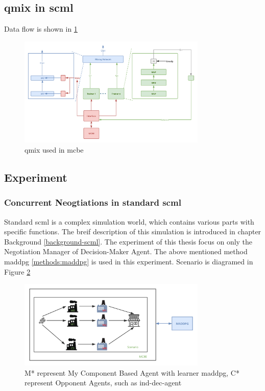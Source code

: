 \subsection{\gls{qmix} in \gls{scml}}
Data flow is shown in \ref{fig:method-qmix-scml}

\begin{figure}[htbp]
\centering
\includegraphics[width=0.80\textwidth]{./images/scml-qmix.png}
\caption{\gls{qmix} used in \gls{mcbe}}
\label{fig:method-qmix-scml}
\end{figure}

\subsection{Experiment}
\subsubsection{Concurrent Neogtiations in standard \gls{scml}}
Standard \gls{scml} is a complex simulation world, which contains various parts with specific functions. The breif description of this simulation is introduced in chapter Background \ref{background-scml}. The experiment of this thesis focus on only the Negotiation Manager of Decision-Maker Agent. The above mentioned method maddpg \ref{methods:maddpg} is used in this experiment. 
Scenario is diagramed in Figure \ref{fig:scenario-standar-scml}

\begin{figure}[htbp]
\centering
\includegraphics[width=0.80\textwidth]{./images/scenario-standar-scml.png}
\caption{M* represent My Component Based Agent with learner \gls{maddpg}, C* represent Opponent Agents, such as \gls{ind-dec-agent}}
\label{fig:scenario-standar-scml}
\end{figure}

